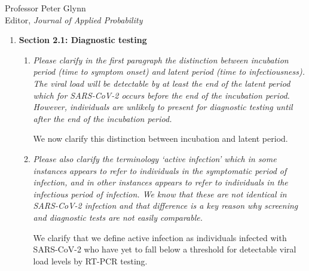 \documentclass[11pt]{letter} %
\begin{document}
\begin{letter}{Professor
	Peter Glynn\\
	Editor, {\em Journal of Applied Probability}}
\begin{enumerate}
\begin{enumerate}
	We now clarify this point in Section 1.1.  We make it clear that our goal is to use a probability sample to correct for selection bias. We connect this with validation samples to build auxiliary data to address selection bias.

	\vspace{5mm}
	\item {\it Finally, consider linking the arguments you are making with recent work on ‘target validity’ (see: \url{https://doi.org/10.1093/aje/kwy228}). Literature on target validity has largely been focused on specifying the problem of tackling internal and external validity together, but the method you propose here is a concrete attempt to address both types of validity and extends this conversation nicely.}
	\vspace{5mm}

	We now do this at the end of Section 1.1 in order to help statisticians thinking about validity connect our arguments to this literature.
	\vspace{5mm}
\end{enumerate}
\item {\bf Section 2.1: Diagnostic testing}
\begin{enumerate}
	\item {\it Please clarify in the first paragraph the distinction between incubation period (time to symptom onset) and latent period (time to infectiousness). The viral load will be detectable by at least the end of the latent period which for SARS-CoV-2 occurs before the end of the incubation period. However, individuals are unlikely to present for diagnostic testing until after the end of the incubation period.}
	\vspace{5mm}

	We now clarify this distinction between incubation and latent period.
	\vspace{5mm}
	\item {\it Please also clarify the terminology ‘active infection’ which in some instances appears to refer to individuals in the symptomatic period of infection, and in other instances appears to refer to individuals in the infectious period of infection. We know that these are not identical in SARS-CoV-2 infection and that difference is a key reason why screening and diagnostic tests are not easily comparable.}
	\vspace{5mm}

	We clarify that we define active infection as individuals infected with SARS-CoV-2 who have yet to fall below a threshold for detectable viral load levels by RT-PCR testing.


\end{enumerate}
\end{enumerate}
\end{letter}
\end{document}
